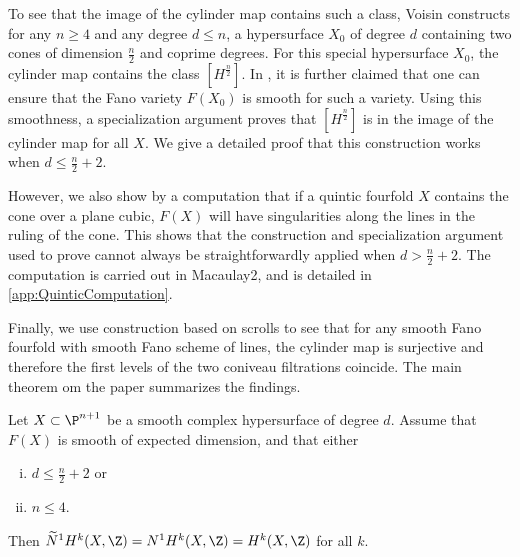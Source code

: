 To see that the image of the cylinder map contains such a class, Voisin constructs for any $n \geq 4$ and any degree $d \leq n$, a hypersurface $X_0$ of degree $d$ containing two cones of dimension $\frac{n}{2}$ and coprime degrees. For this special hypersurface $X_0$, the cylinder map contains the class $[H^{\frac{n}{2}}]$. In \cite{VoisinConiveauThreefolds}, it is further claimed that one can ensure that the Fano variety $F(X_0)$ is smooth for such a variety. Using this smoothness, a specialization argument proves that $[H^{\frac{n}{2}}]$ is in the image of the cylinder map for all $X$. We give a detailed proof that this construction works when $d \leq \frac{n}{2}+2$.

However, we also show by a computation that if a quintic fourfold $X$ contains the cone over a plane cubic, $F(X)$ will have singularities along the lines in the ruling of the cone. This shows that the construction and specialization argument used to prove \cite[Theorem 1.13]{VoisinConiveauThreefolds} cannot always be straightforwardly applied when $d > \frac{n}{2} + 2$. The computation is carried out in Macaulay2, and is detailed in \cref{app:QuinticComputation}.

Finally, we use construction based on scrolls to see that for any smooth Fano fourfold with smooth Fano scheme of lines, the cylinder map is surjective and therefore the first levels of the two coniveau filtrations coincide. The main theorem om the paper summarizes the findings.
\begin{theorem}
	\label{thm:ConiveauIntroductionPart}
	Let $X \subset \P^{n+1}$ be a smooth complex hypersurface of degree $d$. Assume that $F(X)$ is smooth of expected dimension, and that either
	\begin{enumerate}[i)]
		\item$d \leq \frac{n}{2}+2$ or 
		\item $n \leq 4$.
	\end{enumerate}
	Then $\widetilde{N}^1H^k(X,\Z) = N^1H^k(X,\Z) = H^k(X,\Z)$ for all $k$.
\end{theorem}

\printbibliography[heading = subbibliography]
